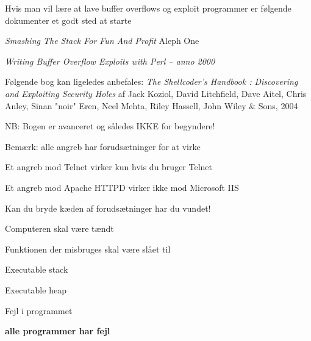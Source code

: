 \documentclass[20pt,landscape,a4paper,footrule]{foils}
\begin{document}


\begin{list1}
\item Hvis man vil lære at lave buffer overflows og exploit programmer
  er følgende dokumenter et godt sted at starte
\item \emph{Smashing The Stack For Fun And Profit} Aleph One
\item \emph{Writing Buffer Overflow Exploits with Perl -- anno 2000}
\item Følgende bog kan ligeledes anbefales:
\emph{The Shellcoder's Handbook : Discovering and Exploiting Security Holes}
af Jack Koziol, David Litchfield, Dave Aitel, Chris Anley, Sinan
"noir" Eren, Neel Mehta, Riley Hassell, John Wiley \& Sons, 2004
\item NB: Bogen er avanceret og således IKKE for begyndere!
\end{list1}




\begin{list1}
\item Bemærk: alle angreb har forudsætninger for at virke
\item Et angreb mod Telnet virker kun hvis du bruger Telnet
\item Et angreb mod Apache HTTPD virker ikke mod Microsoft IIS
\item Kan du bryde kæden af forudsætninger har du vundet!
\end{list1}



\begin{list1}
\item Computeren skal være tændt
\item Funktionen der misbruges skal være slået til
\item Executable stack
\item Executable heap
\item Fejl i programmet
\end{list1}

\vskip 2cm

\centerline{\color{titlecolor}\LARGE \bf alle programmer har fejl}


\end{document}

